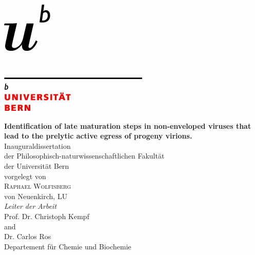 \documentclass[11pt, titlepage, a4paper, twoside, onecolumn, DIV=calc]{scrbook} %
\begin{document}





\setlength{\footskip}{35mm}


\captionsetup[table]{singlelinecheck=off} %




\begin{titlepage}
\begin{flushright}
\includegraphics[scale=0.8, trim= 1mm 1mm 5mm 20mm]{logo} \\[2.9 cm]
\end{flushright}
\begin{center}
{\Huge \bfseries Identification of late maturation steps in non-enveloped viruses that lead to the prelytic active egress of progeny virions.} \\[2 cm]
{\Large Inauguraldissertation \\
der Philosophisch-naturwissenschaftlichen Fakultät \\
der Universität Bern \\[2.2 cm]
{\large vorgelegt von}\\[0.3 cm]
{\LARGE \textsc{Raphael Wolfisberg}} \\[0.3 cm] 
{\large von Neuenkirch, LU} \\ [1.2 cm]
{\Large \emph{Leiter der Arbeit}\\ [0.3 cm]
{\textsc Prof. Dr. Christoph Kempf} \\
and \\
{\textsc Dr. Carlos Ros} \\ [0.9 cm]
Departement für Chemie und Biochemie}}
\end{center}
\end{titlepage}
\end{document}
